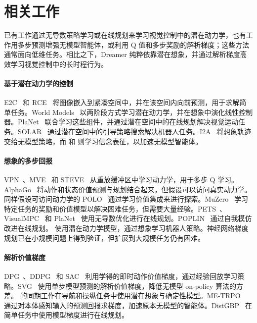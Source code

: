 \section{相关工作}
\label{sec:related}

已有工作通过无导数策略学习或在线规划来学习视觉控制中的潜在动力学，也有工作用多步预测增强无模型智能体，或利用 Q 值和多步奖励的解析梯度；这些方法通常面向低维任务。相比之下，Dreamer 纯粹依靠潜在想象，并通过解析梯度高效学习视觉控制中的长时程行为。

\paragraph{基于潜在动力学的控制}

E2C~\citep{watter2015e2c} 和 RCE~\citep{banijamali2017rce} 将图像嵌入到紧凑空间中，并在该空间内向前预测，用于求解简单任务。World Models~\citep{ha2018worldmodels} 以两阶段方式学习潜在动力学，并在想象中演化线性控制器。PlaNet~\citep{hafner2018planet} 联合学习这些组件，并通过潜在空间中的在线规划解决视觉运动任务。SOLAR~\citep{zhang2018solar} 通过潜在空间中的引导策略搜索解决机器人任务。I2A~\citep{weber2017i2a} 将想象轨迹交给无模型策略，而 \citet{lee2019slac} 和 \citet{gregor2019beliefstate} 则学习信念表征，以加速无模型智能体。

\paragraph{想象的多步回报}

VPN~\citep{oh2017vpn}、MVE~\citep{feinberg2018mve} 和 STEVE~\citep{buckman2018steve} 从重放缓冲区中学习动力学，用于多步 Q 学习。AlphaGo~\citep{silver2017alphago} 将动作和状态价值预测与规划结合起来，但假设可以访问真实动力学。同样假设可访问动力学的 POLO~\citep{lowrey2018polo} 通过学习价值集成来进行探索。MuZero~\citep{schrittwieser2019muzero} 学习特定任务的奖励和价值模型以解决困难任务，但需要大量经验。PETS~\citep{chua2018pets}、VisualMPC~\citep{ebert2017visualmpc} 和 PlaNet~\citep{hafner2018planet} 使用无导数优化进行在线规划。POPLIN~\citep{wang2019poplin} 通过自我模仿改进在线规划。\citet{piergiovanni2018dreaming} 使用潜在动力学模型，通过想象学习机器人策略。神经网络梯度规划已在小规模问题上得到验证\citep{schmidhuber1990diffmodel,henaff2018planbybackprop}，但扩展到大规模任务仍有困难\citep{parmas2019pipps}。

\paragraph{解析价值梯度}

DPG~\citep{silver2014dpg}、DDPG~\citep{lillicrap2015ddpg} 和 SAC~\citep{haarnoja2018sac} 利用学得的即时动作价值梯度，通过经验回放学习策略。SVG~\citep{heess2015svg} 使用单步模型预测的解析价值梯度，降低无模型 on-policy 算法的方差。\citet{byravan2019ivg} 的同期工作在导航和操纵任务中使用潜在想象与确定性模型。ME-TRPO~\citep{kurutach2018modeltrpo} 通过对本体感知输入的预测回报求梯度，加速原本无模型的智能体。DistGBP~\citep{henaff2017planbybackprop,henaff2019planbybackprop} 在简单任务中使用模型梯度进行在线规划。

